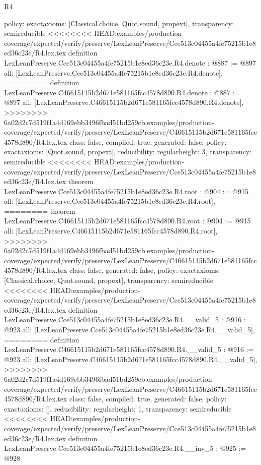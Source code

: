 \begin{lexlean}{R4}
\begin{coremodule}
{{{{{{{{  policy: exact{axioms: [Classical.choice, Quot.sound, propext]},
  transparency: semireducible
}
<<<<<<<< HEAD:examples/production-coverage/expected/verify/preserve/LexLeanPreserve/Cce513c04455a4fe75215b1e8ed36c23e/R4.lex.tex
definition LexLeanPreserve.Cce513c04455a4fe75215b1e8ed36c23e.R4.denote : @887 := @897 {
  all: [LexLeanPreserve.Cce513c04455a4fe75215b1e8ed36c23e.R4.denote],
========
definition LexLeanPreserve.C46615115b2d671e581165fcc4578d890.R4.denote : @887 := @897 {
  all: [LexLeanPreserve.C46615115b2d671e581165fcc4578d890.R4.denote],
>>>>>>>> 6a02d2c7d519f1a4d169ebb3496fbad51bd259cb:examples/production-coverage/expected/verify/preserve/LexLeanPreserve/C46615115b2d671e581165fcc4578d890/R4.lex.tex
  class: false,
  compiled: true,
  generated: false,
  policy: exact{axioms: [Quot.sound, propext]},
  reducibility: regular{height: 3},
  transparency: semireducible
}
<<<<<<<< HEAD:examples/production-coverage/expected/verify/preserve/LexLeanPreserve/Cce513c04455a4fe75215b1e8ed36c23e/R4.lex.tex
theorem LexLeanPreserve.Cce513c04455a4fe75215b1e8ed36c23e.R4.root : @904 := @915 {
  all: [LexLeanPreserve.Cce513c04455a4fe75215b1e8ed36c23e.R4.root],
========
theorem LexLeanPreserve.C46615115b2d671e581165fcc4578d890.R4.root : @904 := @915 {
  all: [LexLeanPreserve.C46615115b2d671e581165fcc4578d890.R4.root],
>>>>>>>> 6a02d2c7d519f1a4d169ebb3496fbad51bd259cb:examples/production-coverage/expected/verify/preserve/LexLeanPreserve/C46615115b2d671e581165fcc4578d890/R4.lex.tex
  class: false,
  generated: false,
  policy: exact{axioms: [Classical.choice, Quot.sound, propext]},
  transparency: semireducible
}
<<<<<<<< HEAD:examples/production-coverage/expected/verify/preserve/LexLeanPreserve/Cce513c04455a4fe75215b1e8ed36c23e/R4.lex.tex
definition LexLeanPreserve.Cce513c04455a4fe75215b1e8ed36c23e.R4.__valid_5 : @916 := @923 {
  all: [LexLeanPreserve.Cce513c04455a4fe75215b1e8ed36c23e.R4.__valid_5],
========
definition LexLeanPreserve.C46615115b2d671e581165fcc4578d890.R4.__valid_5 : @916 := @923 {
  all: [LexLeanPreserve.C46615115b2d671e581165fcc4578d890.R4.__valid_5],
>>>>>>>> 6a02d2c7d519f1a4d169ebb3496fbad51bd259cb:examples/production-coverage/expected/verify/preserve/LexLeanPreserve/C46615115b2d671e581165fcc4578d890/R4.lex.tex
  class: false,
  compiled: true,
  generated: false,
  policy: exact{axioms: []},
  reducibility: regular{height: 1},
  transparency: semireducible
}
<<<<<<<< HEAD:examples/production-coverage/expected/verify/preserve/LexLeanPreserve/Cce513c04455a4fe75215b1e8ed36c23e/R4.lex.tex
definition LexLeanPreserve.Cce513c04455a4fe75215b1e8ed36c23e.R4.__inv_5 : @925 := @928 {
}}}}}}}}}}}
\end{coremodule}
\end{lexlean}
